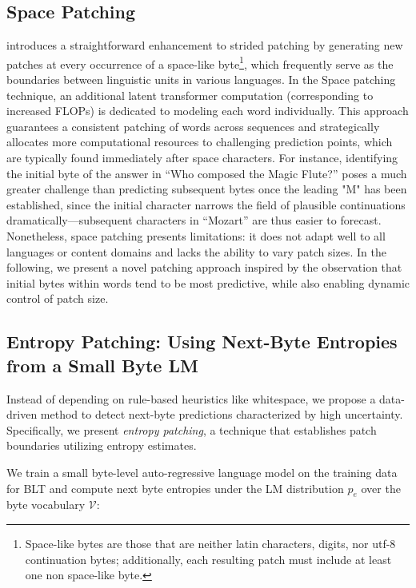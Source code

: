\subsection{Space Patching}
\label{section:white-patch}

\citet{slagle2024spacebyte} introduces a straightforward enhancement to strided patching by generating new patches at every occurrence of a space-like byte\footnote{
    Space-like bytes are those that are neither latin characters, digits, nor utf-8 continuation bytes; additionally, each resulting patch must include at least one non space-like byte.}, which frequently serve as the boundaries between linguistic units in various languages. In the Space patching technique, an additional latent transformer computation (corresponding to increased FLOPs) is dedicated to modeling each word individually. This approach guarantees a consistent patching of words across sequences and strategically allocates more computational resources to challenging prediction points, which are typically found immediately after space characters. For instance, identifying the initial byte of the answer in “Who composed the Magic Flute?\uline{\hspace{.6em}}” poses a much greater challenge than predicting subsequent bytes once the leading "M" has been established, since the initial character narrows the field of plausible continuations dramatically—subsequent characters in “Mozart” are thus easier to forecast. Nonetheless, space patching presents limitations: it does not adapt well to all languages or content domains and lacks the ability to vary patch sizes. In the following, we present a novel patching approach inspired by the observation that initial bytes within words tend to be most predictive, while also enabling dynamic control of patch size.

\subsection{Entropy Patching: Using Next-Byte Entropies from a Small Byte LM}
\label{section:dyn-patch}

Instead of depending on rule-based heuristics like whitespace, we propose a data-driven method to detect next-byte predictions characterized by high uncertainty. Specifically, we present \textit{entropy patching}, a technique that establishes patch boundaries utilizing entropy estimates.

We train a small byte-level auto-regressive language model on the training data for {\textsc BLT} and compute next byte entropies under the LM distribution $p_{e}$ over the byte vocabulary $\mathcal{V}$:

